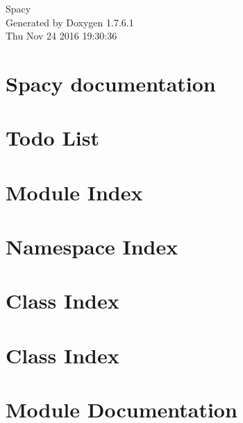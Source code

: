 \documentclass[a4paper]{book}
\begin{document}
\hypersetup{pageanchor=false,citecolor=blue}
\begin{titlepage}
\vspace*{7cm}
\begin{center}
{\Large \-Spacy }\\
\vspace*{1cm}
{\large \-Generated by Doxygen 1.7.6.1}\\
\vspace*{0.5cm}
{\small Thu Nov 24 2016 19:30:36}\\
\end{center}
\end{titlepage}
\clearemptydoublepage
{}
\tableofcontents
\clearemptydoublepage
{}
\hypersetup{pageanchor=true,citecolor=blue}
\chapter{\-Spacy documentation}
\label{index}\hypertarget{index}{}
\chapter{\-Todo \-List}
\label{todo}
\hypertarget{todo}{}

\chapter{\-Module \-Index}

\chapter{\-Namespace \-Index}

\chapter{\-Class \-Index}

\chapter{\-Class \-Index}

\chapter{\-Module \-Documentation}













\end{document}
